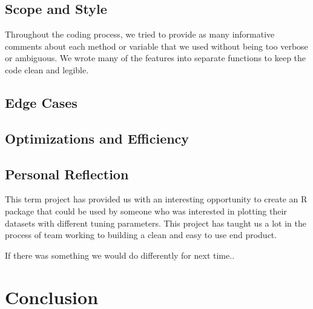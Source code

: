 \documentclass{article}
\begin{document}
\subsection{Scope and Style}
Throughout the coding process, we tried to provide as many informative comments about each method or variable that we used without being too verbose or ambiguous. We wrote many of the features into separate functions to keep the code clean and legible. 

\subsection{Edge Cases}

\subsection{Optimizations and Efficiency}


\subsection{Personal Reflection}
This term project has provided us with an interesting opportunity to create an R package that could be used by someone who was interested in plotting their datasets with different tuning parameters. 
This project has taught us a lot in the process of team working to building a clean and easy to use end product. 

If there was something we would do differently for next time..

\section{Conclusion}

%
%
\end{document}
